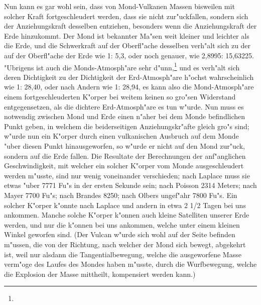 \documentclass[a4paper, 11pt, oneside, polutonikogreek, german]{article}
\begin{document}
Nun kann es gar wohl sein, dass von Mond-Vulkanen Massen bisweilen mit solcher Kraft fortgeschleudert werden, dass sie nicht zur"uckfallen, sondern sich der Anziehungskraft desselben entziehen, besonders wenn die Anziehungskraft der Erde hinzukommt. Der Mond ist bekannter Ma"sen weit kleiner und leichter als die Erde, und die Schwerkraft auf der Oberfl"ache desselben verh"alt sich zu der auf der Oberfl"ache der Erde wie 1: 5,3, oder noch genauer, wie 2,8995: 15,63225. "Ubrigens ist auch die Monds-Atmosph"are sehr d"unn,\footnote{} und es verh"alt sich deren Dichtigkeit zu der Dichtigkeit der Erd-Atmosph"are h"ochst wahrscheinlich wie 1: 28,40, oder nach Andern wie 1: 28,94, es kann also die Mond-Atmosph"are einem fortgeschleuderten K"orper bei weitem keinen so gro"sen Widerstand entgegensetzen, als die dichtere Erd-Atmosph"are es tun w"urde. Nun muss es notwendig zwischen Mond und Erde einen n"aher bei dem Monde befindlichen Punkt geben, in welchem die beiderseitigen Anziehungskr"afte gleich gro"s sind; w"urde nun ein K"orper durch einen vulkanischen Ausbruch auf dem Monde "uber diesen Punkt hinausgeworfen, so w"urde er nicht auf den Mond zur"uck, sondern auf die Erde fallen. Die Resultate der Berechnungen der anf"anglichen Geschwindigkeit, mit welcher ein solcher K"orper vom Monde ausgeschleudert werden m"usste, sind nur wenig voneinander verschieden; nach Laplace muss sie etwas "uber 7771 Fu"s in der ersten Sekunde sein; nach Poisson 2314 Meters; nach Mayer 7700 Fu"s; nach Brandes 8250; nach Olbers ungef"ahr 7800 Fu"s. Ein solcher K"orper k"onnte nach Laplace und andern in etwa 2 1/2 Tagen bei uns ankommen. Manche solche K"orper k"onnen auch kleine Satelliten unserer Erde werden, und nur die k"onnen bei uns ankommen, welche unter einem kleinen Winkel geworfen sind. (Der Vulcan w"urde sich wohl auf der Seite befinden m"ussen, die von der Richtung, nach welcher der Mond sich bewegt, abgekehrt ist, weil nur alsdann die Tangentialbewegung, welche die ausgeworfene Masse verm"oge des Laufes des Mondes haben m"usste, durch die Wurfbewegung, welche die Explosion der Masse mittheilt, kompensiert werden kann.)
\end{document}
